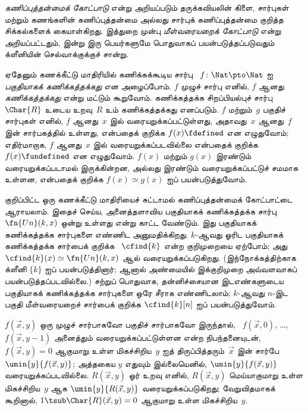 \documentclass[../../../include/open-logic-section]{subfiles}
\begin{document}


\emph{கணிப்புத்தன்மைக் கோட்பாடு} என்று அறியப்படும் தருக்கவியலின்
கிளை, சார்புகள் மற்றும் கணங்களின் கணிப்புத்தன்மை அல்லது சார்புக்
கணிப்புத்தன்மை குறித்த சிக்கல்களைக் கையாள்கிறது. இத்துறை முன்பு
\emph{மீள்வரையறைக் கோட்பாடு} என்று அறியப்பட்டதும், இன்று இரு
பெயர்களுமே பொதுவாகப் பயன்படுத்தப்படுவதும் க்ளீனியின் செல்வாக்குக்குச்
சான்று.

ஏதேனும் கணக்கீட்டு மாதிரியில் கணிக்கக்கூடிய சார்பு
~$f\colon \Nat \pto \Nat$ ஐ \emph{பகுதியாகக் கணிக்கத்தக்கது}
என அழைப்போம். $f$ முழுச் சார்பு எனில், $f$ ஆனது
\emph{கணிக்கத்தக்கது} என்று மட்டும் கூறுவோம். கணிக்கத்தக்க
சிறப்பியல்புச் சார்பு~$\Char{R}$ உடைய உறவு~$R$ உம்
கணிக்கத்தக்கது எனப்படும். $f$ மற்றும்~$g$ பகுதிச் சார்புகள் எனில்,
$f$ ஆனது~$x$ இல் வரையறுக்கப்பட்டுள்ளது, அதாவது~$x$ ஆனது~$f$ இன்
சார்பகத்தில் உள்ளது, என்பதைக் குறிக்க $f(x) \fdefined$ என எழுதுவோம்;
எதிர்மாறாக, $f$ ஆனது~$x$ இல் வரையறுக்கப்படவில்லை என்பதைக் குறிக்க
$f(x) \fundefined$ என எழுதுவோம். $f(x)$ மற்றும் $g(x)$ இரண்டும்
வரையறுக்கப்படாமல் இருக்கின்றன, அல்லது இரண்டும் வரையறுக்கப்பட்டுச்
சமமாக உள்ளன, என்பதைக் குறிக்க $f(x) \simeq g(x)$ ஐப் பயன்படுத்துவோம்.

குறிப்பிட்ட ஒரு கணக்கீட்டு மாதிரியைச் சுட்டாமல் கணிப்புத்தன்மைக்
கோட்பாட்டை ஆராயலாம். இதைச் செய்ய, அனைத்தளாவிய பகுதியாகக் கணிக்கத்தக்க
சார்பு~$\fn{Un}(k, x)$ ஒன்று உள்ளது என்று காட்ட வேண்டும்.
இது பகுதியாகக் கணிக்கத்தக்க சார்புகளை எண்ணிட அனுமதிக்கிறது.
$k$-ஆவது ஓரிட பகுதியாகக் கணிக்கத்தக்க சார்பைக் குறிக்க
~$\cfind{k}$ என்ற குறிமுறையை ஏற்போம்; அது
$\cfind{k}(x) \simeq \fn{Un}(k, x)$ ஆல் வரையறுக்கப்படுகிறது.
(இந்நோக்கத்திற்காக க்ளீனி $\{ k \}$ ஐப் பயன்படுத்தினார்; ஆனால்
அண்மையில் இக்குறிமுறை அவ்வளவாகப் பயன்படுத்தப்படவில்லை.)
சற்றுப் பொதுவாக, தன்னிச்சையான இடஎண்களுடைய பகுதியாகக் கணிக்கத்தக்க
சார்புகளை ஒரே சீராக எண்ணிடலாம்; $k$-ஆவது $n$-இட பகுதி
மீள்வரையறைச் சார்பைக் குறிக்க $\cfind{k}[n]$ ஐப் பயன்படுத்துவோம்.

$f(\vec x, y)$ ஒரு முழுச் சார்பாகவோ பகுதிச் சார்பாகவோ இருந்தால்,
~$f(\vec x, 0)$, \dots, $f(\vec x, y-1)$ அனைத்தும்
வரையறுக்கப்பட்டுள்ளன என்ற நிபந்தனையுடன், $f(\vec x, y) = 0$
ஆகுமாறு உள்ள மிகச்சிறிய~$y$ ஐத் திருப்பித்தரும்~$\vec x$ இன்
சார்பே $\umin{y}{f (\vec x, y)}$; அத்தகைய $y$ எதுவும் இல்லையெனில்,
$\umin{y}{f (\vec x, y)}$ வரையறுக்கப்படவில்லை. $R(\vec x, y)$
ஓர் உறவு எனில், $R(\vec x, y)$ மெய்யாகுமாறு உள்ள மிகச்சிறிய~$y$
ஆக $\umin{y}{R(\vec x, y)}$ வரையறுக்கப்படுகிறது; வேறுவிதமாகக்
கூறினால், $1 \tsub \Char{R}(\vec x, y) = 0$ ஆகுமாறு உள்ள
மிகச்சிறிய~$y$.
\end{document}
